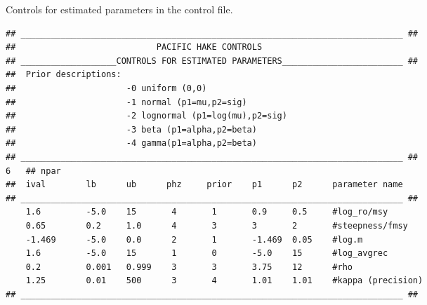 \begin{multicols}{2}
\begin{tablehere}\caption{Controls for estimated parameters in the control file.}\label{Table.parameter.controls}
\begin{tiny}
\begin{verbatim}
## ____________________________________________________________________________ ##
##                            PACIFIC HAKE CONTROLS
## ___________________CONTROLS FOR ESTIMATED PARAMETERS________________________ ##
##  Prior descriptions:
##                      -0 uniform (0,0)
##                      -1 normal (p1=mu,p2=sig)
##                      -2 lognormal (p1=log(mu),p2=sig)
##                      -3 beta (p1=alpha,p2=beta)
##                      -4 gamma(p1=alpha,p2=beta)
## ____________________________________________________________________________ ##
6   ## npar
##  ival        lb      ub      phz     prior    p1      p2      parameter name
## ____________________________________________________________________________ ##
    1.6         -5.0    15       4       1       0.9     0.5     #log_ro/msy 
    0.65        0.2     1.0      4       3       3       2       #steepness/fmsy
    -1.469      -5.0    0.0      2       1       -1.469  0.05    #log.m
    1.6         -5.0    15       1       0       -5.0    15      #log_avgrec
    0.2         0.001   0.999    3       3       3.75    12      #rho
    1.25        0.01    500      3       4       1.01    1.01    #kappa (precision)
## ____________________________________________________________________________ ##
\end{verbatim}
\end{tiny}
\end{tablehere}
%	
%	

\end{multicols}
